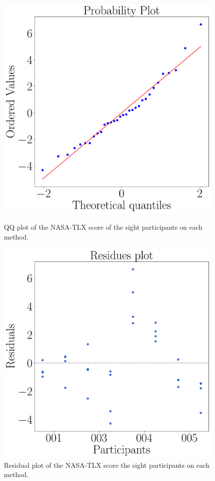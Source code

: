 \begin{figure}[!htb]
    \centering
    \vspace{-15.0cm}
    \begin{minipage}{0.45\textwidth}
        \centering
        \includegraphics[width = 0.8\linewidth]{Resultados/Nasa/Figuras/pdf/qqplot_nasa_avg_two_way_sight.pdf}
        \caption{QQ plot of the NASA-TLX score of the sight participants on each method.}
        \label{fig:qqplot_nasa_avg_two_way_sight}
    \end{minipage}
    \begin{minipage}{0.075\textwidth}
        \hfill
    \end{minipage}
    \begin{minipage}{0.45\textwidth}
        \centering
        \includegraphics[width = 0.8\linewidth]{Resultados/Nasa/Figuras/pdf/residplot_nasa_avg_two_way_sight.pdf}
        \caption{Residual plot of the NASA-TLX score the sight participants on each method.}
        \label{fig:residplot_nasa_avg_two_way_sight}
    \end{minipage}
\end{figure}

\FloatBarrier
